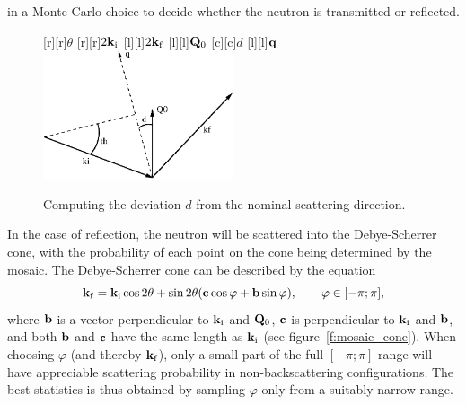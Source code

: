 in a Monte Carlo choice to decide whether the neutron is transmitted or
reflected.
%
\begin{figure}
  \begin{center}
    [r][r]{$\theta$}
    [r][r]{$2{\bf k}_{\rm i}$}
    [l][l]{$2{\bf k}_{\rm f}$}
    [l][l]{${\bf Q}_0$}
    [c][c]{$d$}
    [l][l]{$\bf q$}
    \includegraphics[width=0.5\textwidth]{figures/mosaic_angle.eps}
  \end{center}
\caption{Computing the deviation $d$ from the nominal scattering direction.}
\label{f:mosaic_angle}
\end{figure}

In the case of reflection, the neutron will be scattered into the
Debye-Scherrer cone, with the probability of each point on the cone
being determined by the mosaic. The Debye-Scherrer cone can be described
by the equation
\begin{equation}
  \label{eq:mosaic_cone}
  {\bf k}_{\rm f} = {\bf k}_{\rm i}\cos2\theta +
      \sin2\theta({\bf c}\cos\varphi + {\bf b}\sin\varphi),
      \qquad\varphi\in[-\pi;\pi],
\end{equation}
where ${\bf b}$ is a vector perpendicular to ${\bf k}_{\rm i}$ and ${\bf
Q}_0$, ${\bf c}$ is perpendicular to ${\bf k}_{\rm i}$ and ${\bf b}$,
and both ${\bf b}$ and ${\bf c}$ have the same length as ${\bf k}_{\rm
  i}$ (see figure~\ref{f:mosaic_cone}). When choosing $\varphi$ (and
thereby ${\bf k}_{\rm f}$), only a small part of the full $[-\pi; \pi]$
range will have appreciable scattering probability in non-backscattering
configurations. The best statistics is thus obtained by sampling
$\varphi$ only from a suitably narrow range.

